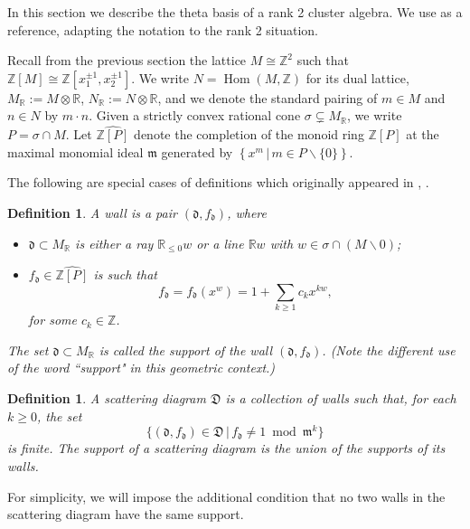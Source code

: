\documentclass[11pt]{amsart}
\newtheorem{defn}[theorem]{Definition}
\theoremstyle{remark}
\numberwithin{equation}{section}
\newcommand{\RR}{\mathbb{R}}
\newcommand{\ZZ}{\mathbb{Z}}
\newcommand{\fd}{\mathfrak{d}}
\newcommand{\fD}{\mathfrak{D}}
\newcommand{\fm}{\mathfrak{m}}
\newcommand{\Hom}{\operatorname{Hom}}
\begin{document}
In this section we describe the theta basis of a rank 2 cluster algebra.  
We use \cite{GHKK} as a reference, adapting 
the notation to the rank 2 situation.


Recall from the previous section the lattice $M \cong \ZZ^2$ such that $\ZZ[M] \cong \ZZ[x_1^{\pm 1}, x_2^{\pm 1}]$.  We write $N = \Hom (M, \ZZ)$ for its dual lattice, $M_{\RR} := M\otimes\RR$, $N_{\RR} := N\otimes\RR$, and we denote the standard pairing of $m\in M$ and $n\in N$ by $m \cdot n$.  Given a strictly convex rational cone $\sigma \subsetneq M_{\RR}$, we write $P=\sigma \cap M$.  Let $\widehat{\ZZ[P]}$ denote the completion of the monoid ring $\ZZ[P]$ at the maximal monomial ideal $\fm$ generated by $\left\{x^m \,|\, m\in P\smallsetminus\{0\}\right\}$.

The following are special cases of definitions which originally appeared in
\cite{KS}, \cite{GS}.

\begin{defn}
  \label{walldef}
  A \emph{wall} is a pair $(\fd, f_{\fd})$, where 
  \begin{itemize}

    \item 
      $\fd \subset M_{\mathbb{R}}$ is either a ray $\RR_{\le 0} w$ or a line
      $\RR w$ with $w\in \sigma \cap(M\smallsetminus 0)$;

    \item 
      $f_{\fd} \in \widehat{\ZZ [P]}$ is such that 
      \[ 
        f_{\fd} = f_{\fd}(x^w) = 1 + \sum_{k\geq 1} c_k x^{k w},
      \] 
      for some $c_k \in \ZZ$. 
  \end{itemize}
  The set $\fd \subset M_{\mathbb{R}}$ is called the \emph{support} of the wall
  $(\fd, f_{\fd})$. (Note the different use of the word ``support" in this geometric context.)
\end{defn}

\begin{defn}
  \label{def:scattering_diagram}
  A scattering diagram $\fD$ is a collection of walls such that, for each $k \geq
  0$, the set
  \[
    \{ (\fd, f_{\fd}) \in \fD\, |\, f_{\fd} \neq 1 \bmod \fm^k \}
  \]
  is finite. The support of a scattering diagram is the union of the supports of its walls.%
\end{defn}
For simplicity, we will impose the additional condition that no two walls in the scattering diagram have the same support.
\end{document}
